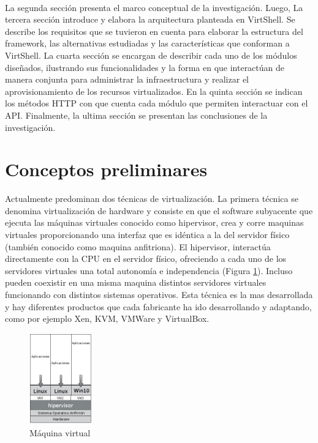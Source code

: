 \documentclass[conference, spanish]{IEEEtran}
\begin{document}
\\
La segunda sección presenta el marco conceptual de la investigación. Luego, La tercera sección introduce y elabora la arquitectura planteada en VirtShell. Se describe los requisitos que se tuvieron en cuenta para elaborar la estructura del framework, las alternativas estudiadas y las características que conforman a VirtShell. La cuarta sección se encargan de describir cada uno de los módulos diseñados, ilustrando sus funcionalidades y la forma en que interactúan de manera conjunta para administrar la infraestructura y realizar el aprovisionamiento de los recursos virtualizados. En la quinta sección se indican los métodos HTTP con que cuenta cada módulo que permiten interactuar con el API. Finalmente, la ultima sección se presentan las conclusiones de la investigación.

\section{Conceptos preliminares}
Actualmente predominan dos técnicas de virtualización. La primera técnica se denomina virtualización de hardware y consiste en que el software subyacente que ejecuta las máquinas virtuales conocido como hipervisor, crea y corre maquinas virtuales proporcionando una interfaz que es idéntica a la del servidor físico (también conocido como maquina anfitriona). El hipervisor, interactúa directamente con la CPU en el servidor físico, ofreciendo a cada uno de los servidores virtuales una total autonomía e independencia (Figura \ref{fig:hipervisor}). Incluso pueden coexistir en una misma maquina distintos servidores virtuales funcionando con distintos sistemas operativos. Esta técnica es la mas desarrollada y hay diferentes productos que cada fabricante ha ido desarrollando y adaptando, como por ejemplo Xen, KVM, VMWare y VirtualBox.\\

\begin{figure}[h]
  \centering
  \includegraphics[width = 0.24\textwidth]{../architecture/v1/diagrams/virtualmachine}
  \caption{Máquina virtual}
  \label{fig:hipervisor}
\end{figure}
\end{document}
